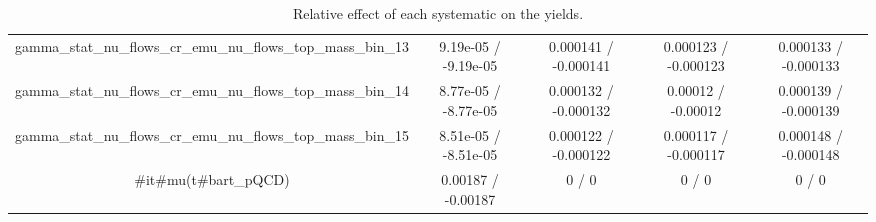 \documentclass[10pt]{article}
\begin{document}
\begin{table}[htbp]
\begin{center}
\begin{tabular}{|c|c|c|c|c|}
  gamma_stat_nu_flows_cr_emu_nu_flows_top_mass_bin_13 & 9.19e-05 / -9.19e-05 & 0.000141 / -0.000141 & 0.000123 / -0.000123 & 0.000133 / -0.000133 \\ 
  gamma_stat_nu_flows_cr_emu_nu_flows_top_mass_bin_14 & 8.77e-05 / -8.77e-05 & 0.000132 / -0.000132 & 0.00012 / -0.00012 & 0.000139 / -0.000139 \\ 
  gamma_stat_nu_flows_cr_emu_nu_flows_top_mass_bin_15 & 8.51e-05 / -8.51e-05 & 0.000122 / -0.000122 & 0.000117 / -0.000117 & 0.000148 / -0.000148 \\ 
  #it{#mu}(t#bar{t}_{pQCD}) & 0.00187 / -0.00187 & 0 / 0 & 0 / 0 & 0 / 0 \\ 
\hline 
\end{tabular} 
\caption{Relative effect of each systematic on the yields.} 
\end{center} 
\end{table} 
\end{document}
